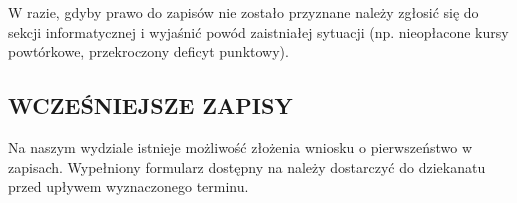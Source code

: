 \documentclass[11pt]{article}
\begin{document}
\begin{enumerate}

\vspace{0.1cm}

\indent \hspace{0.5cm} W razie, gdyby prawo do zapisów nie zostało przyznane należy zgłosić się do sekcji informatycznej i wyjaśnić powód zaistniałej sytuacji (np. nieopłacone kursy powtórkowe, przekroczony deficyt punktowy).\\
\end{enumerate}

\subsection{WCZEŚNIEJSZE ZAPISY}
\indent \hspace{0.5cm}Na naszym wydziale istnieje możliwość złożenia wniosku o pierwszeństwo w zapisach. Wypełniony formularz dostępny na {} należy dostarczyć do dziekanatu przed upływem wyznaczonego terminu. 
\end{document}
